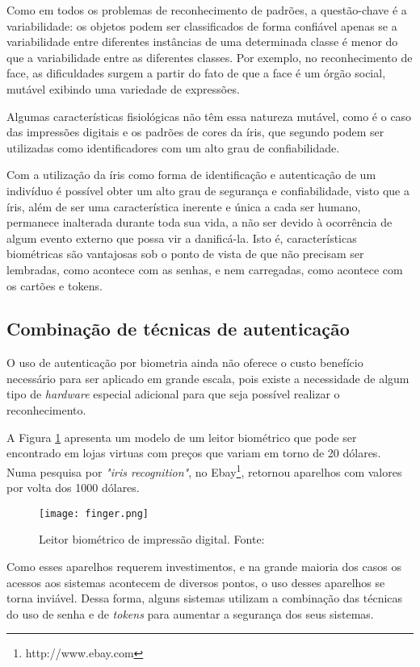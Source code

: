 \begin{citacao}
Como em todos os problemas de reconhecimento de padrões, a questão-chave é a variabilidade: os objetos podem ser classificados de forma confiável apenas se a variabilidade entre diferentes instâncias de uma determinada classe é menor do que a variabilidade entre as diferentes classes. Por exemplo, no reconhecimento de face, as dificuldades surgem a partir do fato de que a face é um órgão social, mutável exibindo uma variedade de expressões. \cite{Daugman2004}
\end{citacao}

Algumas características fisiológicas não têm essa natureza mutável, como é o caso das impressões digitais e os padrões de cores da íris, que segundo \cite{priscila2007} podem ser utilizadas como identificadores com um alto grau de confiabilidade.

\begin{citacao}
Com a utilização da íris como forma de identificação e autenticação de um indivíduo é possível obter um alto grau de segurança e confiabilidade, visto que a íris, além de ser uma característica inerente e única a cada ser humano, permanece inalterada durante toda sua vida, a não ser devido à ocorrência de algum evento externo que possa vir a danificá-la. Isto é, características biométricas são vantajosas sob o ponto de vista de que não precisam ser lembradas, como acontece com as senhas, e nem carregadas, como acontece com os cartões e tokens. \cite{priscila2007}
\end{citacao}

\subsection{Combinação de técnicas de autenticação}
O uso de autenticação por biometria ainda não oferece o custo benefício necessário para ser aplicado em grande escala, pois existe a necessidade de algum tipo de \textit{hardware} especial adicional para que seja possível realizar o reconhecimento.

A Figura \ref{fig:finger} apresenta um modelo de um leitor biométrico que pode ser encontrado em lojas virtuas com preços que variam em torno de 20 dólares. Numa pesquisa por \textit{"iris recognition"}, no Ebay\footnote{http://www.ebay.com}, retornou aparelhos com valores por volta dos 1000 dólares.

\begin{figure}[!htb]
	\centering
	\texttt{[image: finger.png]}
	\small
	\caption[Leitor biométrico de impressão digital]{Leitor biométrico de impressão digital. Fonte: \cite{ebay}}
	\label{fig:finger}
\end{figure}

Como esses aparelhos requerem investimentos, e na grande maioria dos casos os acessos aos sistemas acontecem de diversos pontos, o uso desses aparelhos se torna inviável.
Dessa forma, alguns sistemas utilizam a combinação das técnicas do uso de senha e de \textit{tokens} para aumentar a segurança dos seus sistemas.